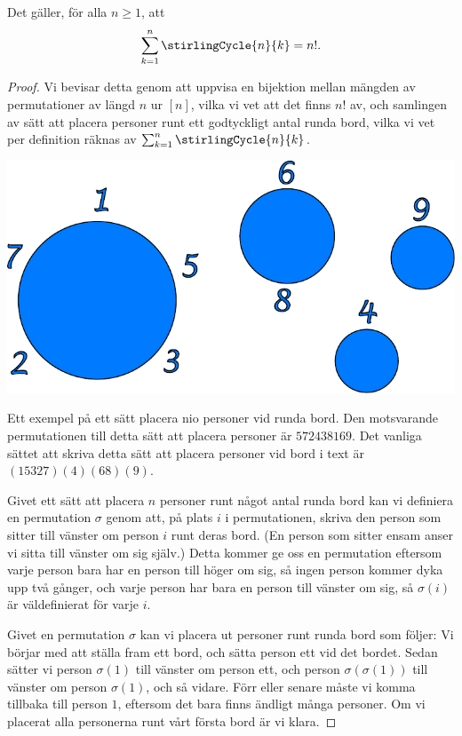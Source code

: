 \documentclass[nobib]{tufte-handout}
\begin{document}
\begin{theorem}
  Det gäller, för alla $n \geq 1$, att
  $$\sum_{k=1}^{n} \stirlingCycle{n}{k} = n!.$$

  \begin{proof}
    Vi bevisar detta genom att uppvisa en bijektion mellan mängden av permutationer av längd $n$ ur $[n]$, vilka vi vet att det finns $n!$ av, och samlingen av sätt att placera personer runt ett godtyckligt antal runda bord, vilka vi vet per definition räknas av $\sum_{k=1}^{n} \stirlingCycle{n}{k}$.

    \begin{marginfigure}\label{fig_cycles_of_permutation}
      \includegraphics{graphics/cycles_of_permutation.pdf}
      \caption{Ett exempel på ett sätt placera nio personer vid runda bord. Den motsvarande permutationen till detta sätt att placera personer är $572438169$. Det vanliga sättet att skriva detta sätt att placera personer vid bord i text är $(15327)(4)(68)(9)$.}
    \end{marginfigure}

    Givet ett sätt att placera $n$ personer runt något antal runda bord kan vi definiera en permutation $\sigma$ genom att, på plats $i$ i permutationen, skriva den person som sitter till vänster om person $i$ runt deras bord. (En person som sitter ensam anser vi sitta till vänster om sig själv.) Detta kommer ge oss en permutation eftersom varje person bara har en person till höger om sig, så ingen person kommer dyka upp två gånger, och varje person har bara en person till vänster om sig, så $\sigma(i)$ är väldefinierat för varje $i$.

    Givet en permutation $\sigma$ kan vi placera ut personer runt runda bord som följer: Vi börjar med att ställa fram ett bord, och sätta person ett vid det bordet. Sedan sätter vi person $\sigma(1)$ till vänster om person ett, och person $\sigma(\sigma(1))$ till vänster om person $\sigma(1)$, och så vidare. Förr eller senare måste vi komma tillbaka till person $1$, eftersom det bara finns ändligt många personer. Om vi placerat alla personerna runt vårt första bord är vi klara.


\end{proof}
\end{theorem}
\end{document}
